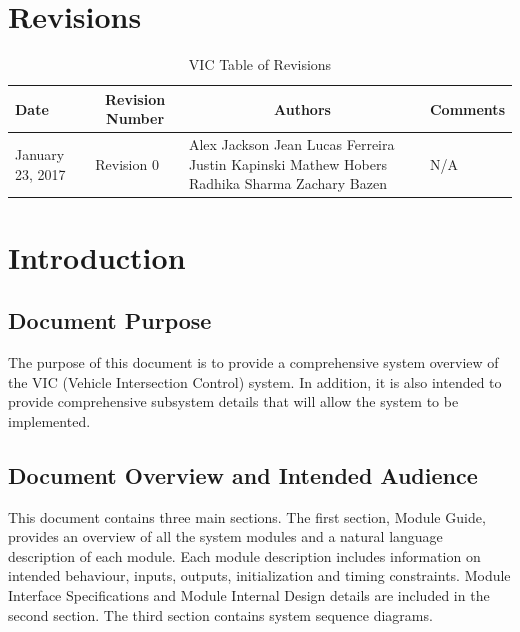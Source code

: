 \documentclass [10pt]{article}
\begin{document}
\section{Revisions}
\begin{longtable}{| p{ } | p{ } | p{ } | p{ } |} \caption{VIC Table of Revisions}  \\

\hline 
\centering \textbf{Date} & 
\multicolumn{1}{c}{\textbf {Revision Number}} &
\multicolumn{1}{|c}{\textbf {Authors}} & 
\multicolumn{1}{|c|}{\textbf {Comments}} \\ \hline

\multirow{4}{*}{\centering January 23, 2017}  & 
\multirow{4}{*}{Revision 0}& 
{Alex Jackson \newline
Jean Lucas Ferreira \newline
Justin Kapinski\newline
Mathew Hobers\newline
Radhika Sharma\newline
Zachary Bazen}
&
 \multirow{4}{*}{N/A} \\ 
\hline 


\end{longtable}
\pagebreak




\section {Introduction}


\subsection{Document Purpose}
The purpose of this document is to provide a comprehensive system overview of the VIC (Vehicle Intersection Control) system. In addition, it is also intended to provide comprehensive subsystem details that will allow the system to be implemented. 


\subsection{Document Overview and Intended Audience}
This document contains three main sections. The first section, Module Guide, provides an overview of all the system modules and a natural language description of each module. Each module description includes information on intended behaviour, inputs, outputs, initialization and timing constraints. Module Interface Specifications and Module Internal Design details are included in the second section. The third section contains system sequence diagrams. \\
\end{document}

